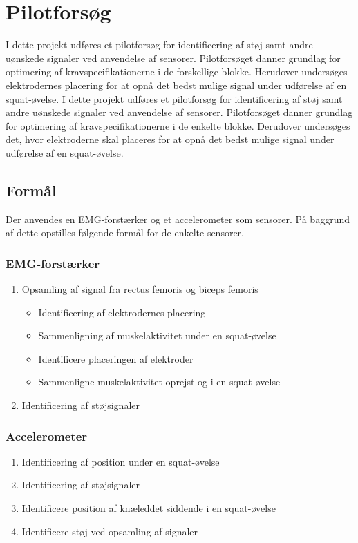 \section{Pilotforsøg}
I dette projekt udføres et pilotforsøg for identificering af støj samt andre uønskede signaler ved anvendelse af sensorer. Pilotforsøget danner grundlag for optimering af kravspecifikationerne i de forskellige blokke. Herudover undersøges elektrodernes placering for at opnå det bedst mulige signal under udførelse af en squat-øvelse.
I dette projekt udføres et pilotforsøg for identificering af støj samt andre uønskede signaler ved anvendelse af sensorer. Pilotforsøget danner grundlag for optimering af kravspecifikationerne i de enkelte blokke. Derudover undersøges det, hvor elektroderne skal placeres for at opnå det bedst mulige signal under udførelse af en squat-øvelse.


\subsection{Formål}
Der anvendes en EMG-forstærker og et accelerometer som sensorer. På baggrund af dette opstilles følgende formål for de enkelte sensorer.  

\subsubsection{EMG-forstærker}
\begin{enumerate}
\item Opsamling af signal fra rectus femoris og biceps femoris
\begin{itemize}
\item Identificering af elektrodernes placering
\item Sammenligning af muskelaktivitet under en squat-øvelse 
\item Identificere placeringen af elektroder
\item Sammenligne muskelaktivitet oprejst og i en squat-øvelse 

\end{itemize}
\item Identificering af støjsignaler
\end{enumerate}


\subsubsection{Accelerometer}
\begin{enumerate}
\item Identificering af position under en squat-øvelse
\item Identificering af støjsignaler
\item Identificere position af knæleddet siddende i en squat-øvelse
\item Identificere støj ved opsamling af signaler

\end{enumerate}


